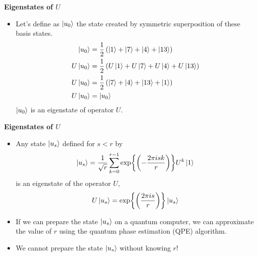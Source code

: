 \documentclass[english]{beamer}
\begin{document}
\begin{frame}{\textbf{Eigenstates of $U$}}

\begin{itemize}
\item Let's define as $\ket{u_0}$ the state created by symmetric superposition of these basis states.
\begin{align}
\ket{u_0}
    &=
        \frac{1}{2} \left (
                \ket{1} + \ket{7} + \ket{4} + \ket{13}
        \right ) \notag  \\
U\ket{u_0}
    &=
        \frac{1}{2} \left (
                U\ket{1} + U\ket{7} + U\ket{4} + U\ket{13}
        \right ) \notag \\
U\ket{u_0}
    &=
        \frac{1}{2} \left (
                \ket{7} + \ket{4} + \ket{13} + \ket{1}
        \right )  \notag \\
U\ket{u_0}
        &=
                \ket{u_0} \notag
\end{align}
$\ket{u_0}$ is an eigenstate of operator $U$.

\end{itemize}
\end{frame}

\begin{frame}{\textbf{Eigenstates of $U$}}

\begin{itemize}
\item Any state $\ket{u_s}$ defined for $s<r $ by
\begin{equation}
	\ket{u_s}
        =
                \frac{1}{\sqrt{r}} \sum_{k=0}^{r-1} \exp{\left (-\frac{2 \pi i s k}{r} \right )} U^k\ket{1}
\end{equation}
is an eigenstate of the operator $U$,
\begin{equation}
	U \ket{u_s}
                =
                        \exp{\left(\frac{2 \pi i s}{r}\right)} \ket{u_s}
\end{equation}
\item If we can prepare the state $\ket{u_s}$ on a quantum computer, we can approximate the value of $r$ using the quantum phase estimation (QPE) algorithm.  
\item We cannot prepare the state $\ket{u_s}$ without knowing $r$!
\end{itemize}
\end{frame}
\end{document}
